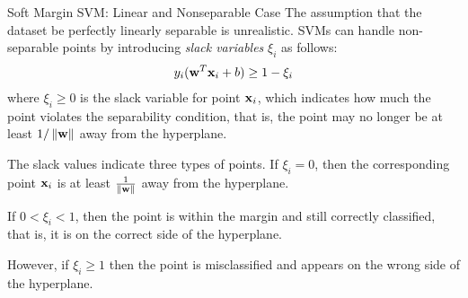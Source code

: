 \begin{frame}{Soft Margin SVM: Linear and Nonseparable Case}
The assumption that the dataset be perfectly linearly
separable is unrealistic. 
SVMs can handle non-separable
points by introducing {\em slack variables} $\xi_i$ 
as follows: 
\begin{align*}
y_{i} (\mathbf{w}^{T}\mathbf{x}_{i}+b) \geq 1-\xi_{i}
\end{align*}
where $\xi_i \ge 0$ is the slack variable for point $\mathbf{x}_i$, which
indicates how much the point violates the separability condition,
that is, the point may no longer be at least $1/\left\lVert\mathbf{w}\right\rVert$ away
from the hyperplane. 

\medskip
The slack values indicate three types of
points. If $\xi_i=0$, then the corresponding point $\mathbf{x}_i$ is at least
$1 \over \|\mathbf{w}\|$ away from the hyperplane. 

\medskip
If $0 < \xi_i
< 1$, then the point is within the margin and still correctly
classif\/{i}ed, that is, it is on the correct side of the hyperplane.

\medskip
However, if $\xi_i \ge 1$ then the point is misclassif\/{i}ed and
appears on the wrong side of the hyperplane.
\end{frame}





